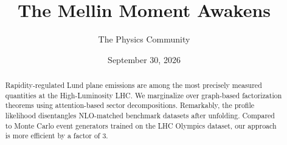 \documentclass[11pt]{article}
\title{The Mellin Moment Awakens}
\author{The Physics Community}
\date{September 30, 2026}
\begin{document}
\maketitle
\begin{abstract}
Rapidity-regulated Lund plane emissions are among the most precisely
measured quantities at the High-Luminosity LHC. We marginalize over
graph-based factorization theorems using attention-based sector
decompositions. Remarkably, the profile likelihood disentangles
NLO-matched benchmark datasets after unfolding. Compared to Monte Carlo
event generators trained on the LHC Olympics dataset, our approach is
more efficient by a factor of 3.
\end{abstract}
\tableofcontents




\nocite{*}


\end{document}

